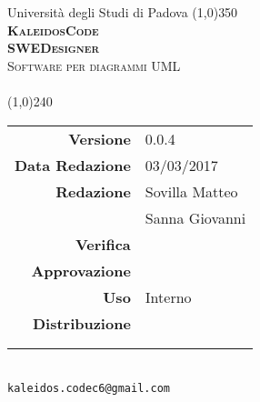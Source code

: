 \documentclass[a4paper,12pt]{article}
\author{KaleidosCode}
\date{03/03/2017}	%
\begin{document}
	\begin{titlepage}
		\centering Università degli Studi di Padova
		\line(1,0){350}\\
		\vspace{0.4cm}
		{\bfseries\scshape\LARGE KaleidosCode\\}
		\vspace{0.4cm}
		{\bfseries\scshape\LARGE SWEDesigner\\}
		{\scshape\Large Software per diagrammi UML\\}
		\vspace{1cm}
		{\scshape\Large \pianodiprogettoi\ \\}		%
		\vspace{1.4cm}
		\logo
		\vspace{1.2cm}
		\line(1,0){240}\\
		\begin{tabular}{r|l}
			{\hfill \textbf{Versione}} 			& 0.0.4\\
			{\hfill \textbf{Data Redazione}} 	& 03/03/2017\\	%
			{\hfill \textbf{Redazione}} 		& Sovilla Matteo \\ & Sanna Giovanni \\
			{\hfill \textbf{Verifica}} 			& \\
			{\hfill \textbf{Approvazione}} 		& \\
			{\hfill \textbf{Uso}} 				& Interno\\
			{\hfill \textbf{Distribuzione}} 	& \vardanega \\ & \cardin \\ & \proponente\\
		\end{tabular}\\
		\vspace{2cm}
		\texttt{kaleidos.codec6@gmail.com}
	\end{titlepage}

	\pagestyle{myfront}
	\newpage
		
	\newpage
		\tableofcontents
	\pagestyle{mymain}
	\newpage
		
	\newpage
		
	\newpage
		
	\newpage
		
	\newpage
		
	\label{LastPage}
\end{document}

